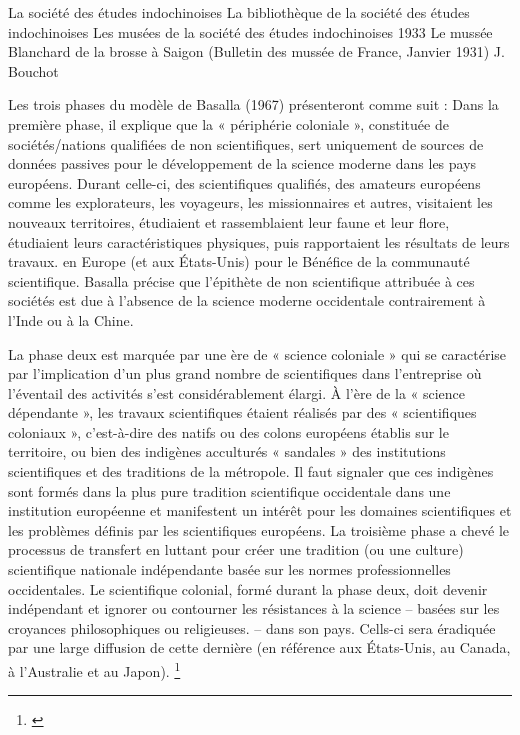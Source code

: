 La société des études indochinoises
La bibliothèque de la société des études indochinoises
Les musées de la société des études indochinoises
1933
Le mussée Blanchard de la brosse à Saigon (Bulletin des mussée de France, Janvier 1931) J. Bouchot


Les trois phases du modèle de Basalla (1967) présenteront comme suit :
Dans la première phase, il explique que la « périphérie coloniale », constituée de sociétés/nations qualifiées de non scientifiques, sert uniquement de sources de données passives pour le développement de la science moderne dans les pays européens. Durant celle-ci, des scientifiques qualifiés, des amateurs européens comme les explorateurs, les voyageurs, les missionnaires et autres, visitaient les nouveaux territoires, étudiaient et rassemblaient leur faune et leur flore, étudiaient leurs caractéristiques physiques, puis rapportaient les résultats de leurs travaux. en Europe (et aux États-Unis) pour le Bénéfice de la communauté scientifique. Basalla précise que l'épithète de non scientifique attribuée à ces sociétés est due à l'absence de la science moderne occidentale contrairement à l'Inde ou à la Chine.

La phase deux est marquée par une ère de « science coloniale » qui se caractérise par l’implication d’un plus grand nombre de scientifiques dans l’entreprise où l’éventail des activités s’est considérablement élargi. À l'ère de la « science dépendante », les travaux scientifiques étaient réalisés par des « scientifiques coloniaux », c'est-à-dire des natifs ou des colons européens établis sur le territoire, ou bien des indigènes acculturés « sandales » des institutions scientifiques et des traditions de la métropole. Il faut signaler que ces indigènes sont formés dans la plus pure tradition scientifique occidentale dans une institution européenne et manifestent un intérêt pour les domaines scientifiques et les problèmes définis par les scientifiques européens.
La troisième phase a chevé le processus de transfert en luttant pour créer une tradition (ou une culture) scientifique nationale indépendante basée sur les normes professionnelles occidentales. Le scientifique colonial, formé durant la phase deux, doit devenir indépendant et ignorer ou contourner les résistances à la science – basées sur les croyances philosophiques ou religieuses.  – dans son pays. Cells-ci sera éradiquée par une large diffusion de cette dernière (en référence aux États-Unis, au Canada, à l’Australie et au Japon). \footnote{\cite{liu}}






